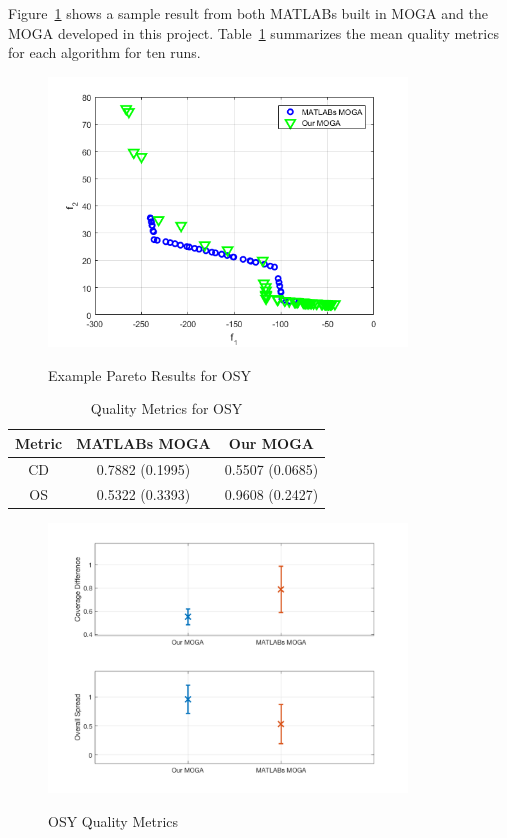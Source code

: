 \documentclass{article}
\begin{document}
\noindent Figure~\ref{fig:OSY} shows a sample result from both MATLABs built in MOGA and the MOGA developed in this project. Table~\ref{tab:OSY} summarizes the mean quality metrics for each algorithm for ten runs.
\begin{figure}[H]
  \caption{Example Pareto Results for OSY}
  \centering
  \includegraphics[width=0.85\textwidth]{OSY_pareto_final.png}  
  \label{fig:OSY}
\end{figure}

\begin{table}[H]
\caption{Quality Metrics for OSY} 
\centering 
\begin{tabular}{|c|c|c|} 
\hline
Metric & MATLABs MOGA & Our MOGA \\ \hline
CD & 0.7882 (0.1995) & 0.5507 (0.0685)  \\ \hline
OS & 0.5322 (0.3393) & 0.9608 (0.2427) \\ \hline
\end{tabular}
\label{tab:OSY} 
\end{table}
\begin{figure}[H]
  \caption{OSY Quality Metrics}
  \centering
  \includegraphics[width=0.85\textwidth]{OSY_QM.png}  
  \label{fig:OSY_QM}
\end{figure}
\newpage
\end{document}
